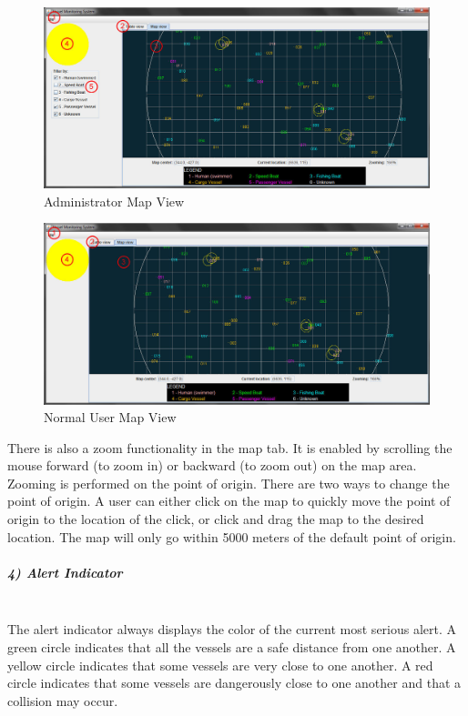 \documentclass{article}
\begin{document}
	\begin{figure}[!htb]
	\caption{Administrator Map View}
	\centering
	\includegraphics[scale=0.36]{images/userManual3_admin.jpg}
	\end{figure}

	\begin{figure}[!htb]
	\caption{Normal User Map View}
	\centering
	\includegraphics[scale=0.36]{images/userManual3_user.jpg}
	\end{figure}

There is also a zoom functionality in the map tab. It is enabled by scrolling the mouse forward (to zoom in) or backward (to zoom out) on the map area. Zooming is performed on the point of origin. There are two ways to change the point of origin. A user can either click on the map to quickly move the point of origin to the location of the click, or click and drag the map to the desired location. The map will only go within 5000 meters of the default point of origin.

\pagebreak
\subparagraph{4) Alert Indicator \\ \\}
The alert indicator always displays the color of the current most serious alert. A green circle indicates that all the vessels are a safe distance from one another. A yellow circle indicates that some vessels are very close to one another. A red circle indicates that some vessels are dangerously close to one another and that a collision may occur.\\
\end{document}
